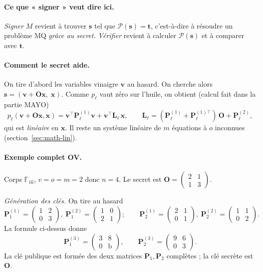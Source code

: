 \paragraph{Ce que « signer » veut dire ici.} \emph{Signer} $M$ revient à trouver $\mathbf{s}$ tel que $\mathcal{P}(\mathbf{s})=\mathbf{t}$, c'est-à-dire à résoudre un problème MQ \emph{grâce au secret}. \emph{Vérifier} revient à calculer $\mathcal{P}(\mathbf{s})$ et à comparer avec $\mathbf{t}$.

\paragraph{Comment le secret aide.} On tire d'abord les variables vinaigre $\mathbf{v}$ au hasard. On cherche alors $\mathbf{s}=(\mathbf{v}+\mathbf{O}\mathbf{x},\;\mathbf{x})$. Comme $p_\ell$ vaut zéro sur l'huile, on obtient (calcul fait dans la partie MAYO)
\[p_\ell(\mathbf{v}+\mathbf{O}\mathbf{x},\mathbf{x})=\mathbf{v}^{\top}\mathbf{P}^{(1)}_\ell\mathbf{v}+\mathbf{v}^{\top}\mathbf{L}_\ell\,\mathbf{x},\qquad \mathbf{L}_\ell=(\mathbf{P}^{(1)}_\ell+\mathbf{P}^{(1)\top}_\ell)\,\mathbf{O}+\mathbf{P}^{(2)}_\ell,\]
qui est \emph{linéaire} en $\mathbf{x}$. Il reste un système linéaire de $m$ équations à $o$ inconnues (section~\ref{sec:math-lin}).

\paragraph{Exemple complet OV.} Corps $\mathbb{F}_{16}$, $v=o=m=2$ donc $n=4$. Le secret est $\mathbf{O}=\begin{pmatrix}2&1\\1&3\end{pmatrix}$.

\emph{Génération des clés.} On tire au hasard
\[\mathbf{P}^{(1)}_1=\begin{pmatrix}1&2\\0&3\end{pmatrix},\ \mathbf{P}^{(2)}_1=\begin{pmatrix}1&0\\2&1\end{pmatrix};\qquad \mathbf{P}^{(1)}_2=\begin{pmatrix}2&1\\0&1\end{pmatrix},\ \mathbf{P}^{(2)}_2=\begin{pmatrix}1&1\\0&2\end{pmatrix}.\]
La formule ci-dessus donne
\[\mathbf{P}^{(3)}_1=\begin{pmatrix}3&8\\0&\mathrm{b}\end{pmatrix},\qquad \mathbf{P}^{(3)}_2=\begin{pmatrix}9&6\\0&3\end{pmatrix}.\]
La clé publique est formée des deux matrices $\mathbf{P}_1,\mathbf{P}_2$ complètes ; la clé secrète est $\mathbf{O}$.

